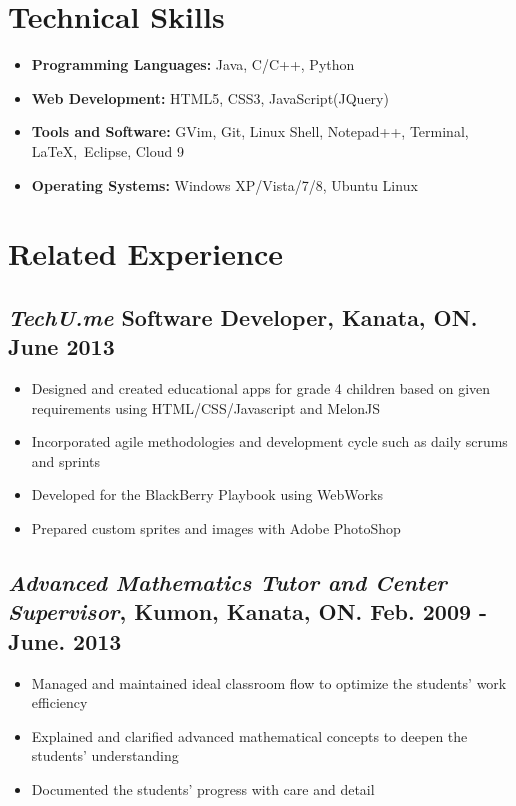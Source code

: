 \documentclass[12pt]{article}
\begin{document}
\section*{Technical Skills} \vspace{-12pt}
	\begin{itemize}
	\item \textbf{Programming Languages:} Java, C/C++, Python
	\item \textbf{Web Development:} HTML5, CSS3, JavaScript(JQuery)
	\item \textbf{Tools and Software:} GVim, Git, Linux Shell, Notepad++, Terminal,  \LaTeX,\  Eclipse, Cloud 9	
	\item \textbf{Operating Systems:} Windows XP/Vista/7/8, Ubuntu Linux
	\end{itemize}

\section*{Related Experience} \vspace{-12pt}
	\subsection*{\textit{TechU.me} Software Developer, Kanata, ON. June 2013}
		\begin{itemize} \vspace{-10pt}
		\item Designed and created educational apps for grade 4 children based on given requirements using 			 	HTML/CSS/Javascript and MelonJS
		\item Incorporated agile methodologies and development cycle such as daily scrums and sprints
		\item Developed for the BlackBerry Playbook using WebWorks
		\item Prepared custom sprites and images with Adobe PhotoShop
		\end{itemize}	
	\subsection*{\textit{Advanced Mathematics Tutor and Center Supervisor}, Kumon, Kanata, ON. Feb. 2009 - June. 2013}
		\begin{itemize} \vspace{-10pt}
		\item Managed and maintained ideal classroom flow to optimize the students' work efficiency
		\item Explained and clarified advanced mathematical concepts to deepen the students' understanding
		\item Documented the students' progress with care and detail
		\end{itemize}
\end{document}
